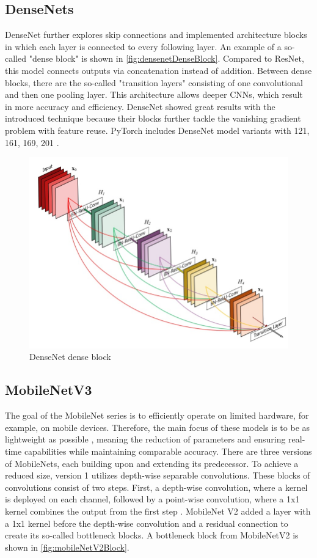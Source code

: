 \subsection{DenseNets}

DenseNet \cite{DenseNets} further explores skip connections and implemented architecture blocks in which each layer is connected to every following layer.
An example of a so-called "dense block" is shown in \autoref{fig:densenetDenseBlock}.
Compared to ResNet, this model connects outputs via concatenation instead of addition.
Between dense blocks, there are the so-called "transition layers" consisting of one convolutional and then one pooling layer.
This architecture allows deeper \ac{CNN}s, which result in more accuracy and efficiency.
DenseNet showed great results with the introduced technique because their blocks further tackle the vanishing gradient problem with feature reuse.
PyTorch includes DenseNet model variants with 121, 161, 169, 201 \cite{pytorchdensenet}.

\begin{figure}[H]
    \centering
    \includegraphics[width=0.6\linewidth]{PICs/backbones/densenet_denseBlock.jpg}
    \caption{DenseNet dense block \cite{DenseNets}}
    \label{fig:densenetDenseBlock}
\end{figure}

\vspace{0.5cm}

\subsection{MobileNetV3}

The goal of the MobileNet series \cite{MobileNetV3} is to efficiently operate on limited hardware, for example, on mobile devices.
Therefore, the main focus of these models is to be as lightweight as possible \cite{networkArchitectureSurvey}, meaning the reduction of parameters and ensuring real-time capabilities while maintaining comparable accuracy.
There are three versions of MobileNets, each building upon and extending its predecessor.
To achieve a reduced size, version 1 utilizes depth-wise separable convolutions.
These blocks of convolutions consist of two steps. First, a depth-wise convolution, where a kernel is deployed on each channel, followed by a point-wise convolution, where a 1x1 kernel combines the output from the first step \cite{networkArchitectureSurvey}.
MobileNet V2 added a layer with a 1x1 kernel before the depth-wise convolution and a residual connection to create its so-called bottleneck blocks.
A bottleneck block from MobileNetV2 is shown in \autoref{fig:mobileNetV2Block}.

